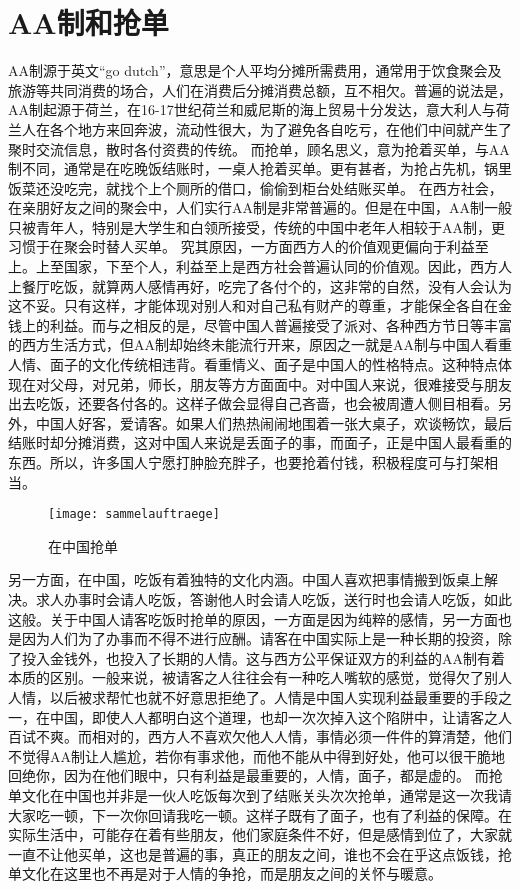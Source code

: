\section{AA制和抢单}
AA制源于英文“go dutch”，意思是个人平均分摊所需费用，通常用于饮食聚会及旅游等共同消费的场合，人们在消费后分摊消费总额，互不相欠。普遍的说法是，AA制起源于荷兰，在16-17世纪荷兰和威尼斯的海上贸易十分发达，意大利人与荷兰人在各个地方来回奔波，流动性很大，为了避免各自吃亏，在他们中间就产生了聚时交流信息，散时各付资费的传统。
而抢单，顾名思义，意为抢着买单，与AA制不同，通常是在吃晚饭结账时，一桌人抢着买单。更有甚者，为抢占先机，锅里饭菜还没吃完，就找个上个厕所的借口，偷偷到柜台处结账买单。
在西方社会，在亲朋好友之间的聚会中，人们实行AA制是非常普遍的。但是在中国，AA制一般只被青年人，特别是大学生和白领所接受，传统的中国中老年人相较于AA制，更习惯于在聚会时替人买单。
究其原因，一方面西方人的价值观更偏向于利益至上。上至国家，下至个人，利益至上是西方社会普遍认同的价值观。因此，西方人上餐厅吃饭，就算两人感情再好，吃完了各付个的，这非常的自然，没有人会认为这不妥。只有这样，才能体现对别人和对自己私有财产的尊重，才能保全各自在金钱上的利益。而与之相反的是，尽管中国人普遍接受了派对、各种西方节日等丰富的西方生活方式，但AA制却始终未能流行开来，原因之一就是AA制与中国人看重人情、面子的文化传统相违背。看重情义、面子是中国人的性格特点。这种特点体现在对父母，对兄弟，师长，朋友等方方面面中。对中国人来说，很难接受与朋友出去吃饭，还要各付各的。这样子做会显得自己吝啬，也会被周遭人侧目相看。另外，中国人好客，爱请客。如果人们热热闹闹地围着一张大桌子，欢谈畅饮，最后结账时却分摊消费，这对中国人来说是丢面子的事，而面子，正是中国人最看重的东西。所以，许多国人宁愿打肿脸充胖子，也要抢着付钱，积极程度可与打架相当。
\begin{figure}
    \centering
    \texttt{[image: sammelauftraege]}
    \caption{在中国抢单}
\end{figure}
\par
另一方面，在中国，吃饭有着独特的文化内涵。中国人喜欢把事情搬到饭桌上解决。求人办事时会请人吃饭，答谢他人时会请人吃饭，送行时也会请人吃饭，如此这般。关于中国人请客吃饭时抢单的原因，一方面是因为纯粹的感情，另一方面也是因为人们为了办事而不得不进行应酬。请客在中国实际上是一种长期的投资，除了投入金钱外，也投入了长期的人情。这与西方公平保证双方的利益的AA制有着本质的区别。一般来说，被请客之人往往会有一种吃人嘴软的感觉，觉得欠了别人人情，以后被求帮忙也就不好意思拒绝了。人情是中国人实现利益最重要的手段之一，在中国，即使人人都明白这个道理，也却一次次掉入这个陷阱中，让请客之人百试不爽。而相对的，西方人不喜欢欠他人人情，事情必须一件件的算清楚，他们不觉得AA制让人尴尬，若你有事求他，而他不能从中得到好处，他可以很干脆地回绝你，因为在他们眼中，只有利益是最重要的，人情，面子，都是虚的。
而抢单文化在中国也并非是一伙人吃饭每次到了结账关头次次抢单，通常是这一次我请大家吃一顿，下一次你回请我吃一顿。这样子既有了面子，也有了利益的保障。在实际生活中，可能存在着有些朋友，他们家庭条件不好，但是感情到位了，大家就一直不让他买单，这也是普遍的事，真正的朋友之间，谁也不会在乎这点饭钱，抢单文化在这里也不再是对于人情的争抢，而是朋友之间的关怀与暖意。